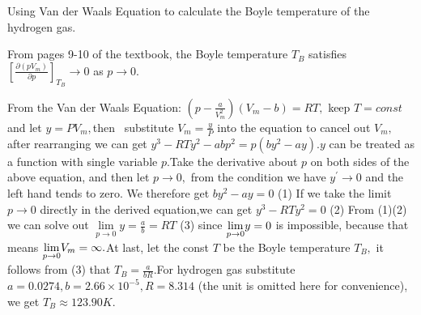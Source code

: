 \documentclass{ctexart}
\begin{document}
Using Van der Waals Equation to calculate the Boyle temperature of the
hydrogen gas.

From pages 9-10 of the textbook, the Boyle temperature $T_{B}$ satisfies $%
\left[ \frac{\partial (pV_{m})}{\partial p}\right] _{T_{B}}\rightarrow 0$ as 
$p\rightarrow 0.$

From the Van der Waals Equation: $(p-\frac{a}{V_{m}^{2}})(V_{m}-b)=RT,$ keep 
$T=const$ and let $y=PV_{m},$then \qquad\ substitute $V_{m}=\frac{y}{P}$
into the equation to cancel out $V_{m},$ after rearranging we can get $%
y^{3}-RTy^{2}-abp^{2}=p(by^{2}-ay).y$ can be treated as a function with
single variable $p$.Take the derivative about $p$ on both sides of the above
equation, and then let $p\rightarrow 0,$ from the condition we have $%
y^{\prime }\rightarrow 0$ and the left hand tends to zero. We therefore get $%
by^{2}-ay=0$ (1) If we take the limit $p\rightarrow 0$ directly in the
derived equation,we can get $y^{3}-RTy^{2}=0$ (2) From (1)(2) we can solve
out $\underset{p\rightarrow 0}{\lim }y=\frac{a}{b}=RT$ (3) since $\underset{%
p\rightarrow 0}{\lim }y=0$ is impossible, because that means $\underset{%
p\rightarrow 0}{\lim }V_{m}=\infty .$At last, let the const $T$ be the Boyle
temperature $T_{B},$ it follows from (3) that $T_{B}=\frac{a}{bR}.$For
hydrogen gas substitute $a=0.0274,b=2.66\times 10^{-5},R=8.314$ (the unit is
omitted here for convenience), we get $T_{B}\approx 123.90K.$
\end{document}
